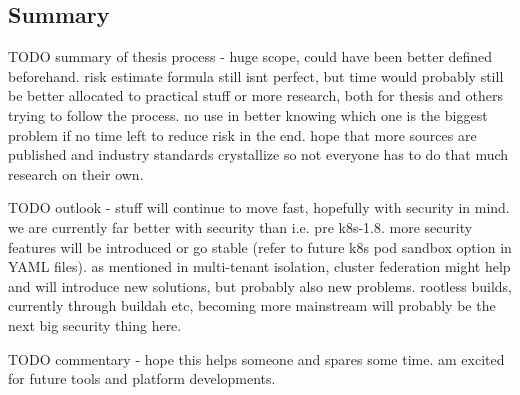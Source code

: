 
\subsection{Summary}

TODO summary of thesis process - huge scope, could have been better defined beforehand. risk estimate formula still isnt perfect, but time would probably still be better allocated to practical stuff or more research, both for thesis and others trying to follow the process. no use in better knowing which one is the biggest problem if no time left to reduce risk in the end. hope that more sources are published and industry standards crystallize so not everyone has to do that much research on their own.

TODO outlook - stuff will continue to move fast, hopefully with security in mind. we are currently far better with security than i.e. pre k8s-1.8. more security features will be introduced or go stable (refer to future k8s pod sandbox option in YAML files). as mentioned in multi-tenant isolation, cluster federation might help and will introduce new solutions, but probably also new problems. rootless builds, currently through buildah etc, becoming more mainstream will probably be the next big security thing here.

TODO commentary - hope this helps someone and spares some time. am excited for future tools and platform developments.
